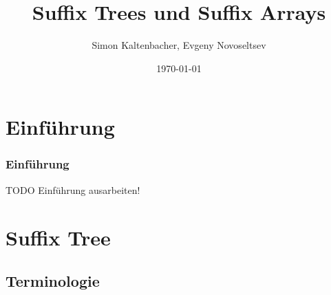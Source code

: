 \documentclass{beamer}
\title{Suffix Trees und Suffix Arrays}
\author{Simon Kaltenbacher, Evgeny Novoseltsev}
\date{\today}
\begin{document}
\frame{\titlepage}


\section{Einführung}

\begin{frame}
\frametitle{Einführung}
TODO Einführung ausarbeiten!
\end{frame}

\section{Suffix Tree}

\subsection{Terminologie}
\end{document}
